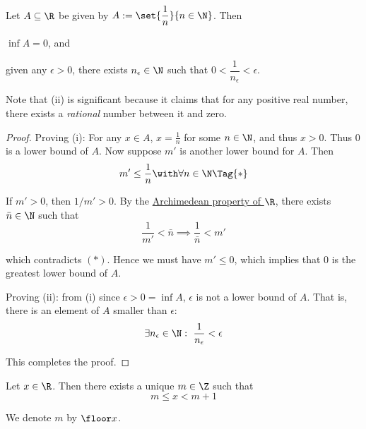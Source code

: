 Let $A\subseteq\R$ be given by $A:=\set{\dfrac1n}{n\in\N}$. Then
\begin{enumerati}
  \item $\inf A=0$, and
  \item given any $\epsilon>0$, there exists $n_\epsilon\in\N$ such that
  $0<\dfrac1{n_\epsilon}<\epsilon$.
\end{enumerati}

Note that (ii) is significant because it claims that for any positive real
number, there exists a \textit{rational} number between it and zero.

\begin{proof}
  Proving (i): For any $x\in A$, $x=\frac1n$ for some $n\in\N$, and thus $x>0$.
  Thus $0$ is a lower bound of $A$. Now suppose $m'$ is another lower bound for
  $A$. Then
  \begin{equation*}
    m'\leq\frac1n\with\forall n\in\N\Tag{*}
  \end{equation*}

  If $m'>0$, then $1/m'>0$. By the \href{fbc2289}{Archimedean property of $\R$},
  there exists $\bar n\in\N$ such that
  $$
    \frac1{m'}<\bar n\implies\frac1{\bar n}<m'
  $$

  which contradicts $(*)$. Hence we must have $m'\leq0$, which implies that 0 is
  the greatest lower bound of $A$.

  Proving (ii): from (i) since $\epsilon>0=\inf A$, $\epsilon$ is not a lower
  bound of $A$. That is, there is an element of $A$ smaller than $\epsilon$:
  $$
    \exists n_\epsilon\in\N:\ \frac1{n_\epsilon}<\epsilon
  $$

  This completes the proof.
\end{proof}

\label{abc7dbd}

Let $x\in\R$. Then there exists a unique $m\in\Z$ such that
$$
  m\leq x<m+1
$$

We denote $m$ by $\floor x$.


